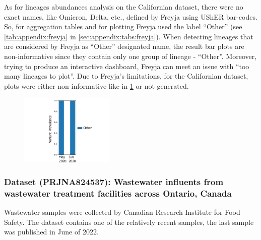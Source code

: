     As for lineages abundances analysis on the Californian dataset, there were no exact names, like Omicron, Delta, etc., defined by Freyja using UShER bar-codes. So, for aggregation tables and for plotting Freyja used the label “Other” (see \cref{tab:appendix:freyja} in \cref{sec:appendix:tabs:freyja}). When detecting lineages that are considered by Freyja as “Other” designated name, the result bar plots are non-informative since they contain only one group of lineage - “Other”. Moreover, trying to produce an interactive dashboard, Freyja can meet an issue with “too many lineages to plot”. Due to Freyja's limitations, for the Californian dataset, plots were either non-informative like in \cref{fig:results:real:non-informative-freyja} or not generated.
    \begin{figure}[ht!]
        \centering
        \includegraphics[width=0.4\textwidth]{figures/results/real/non-informative-freyja.png}
        \label{fig:results:real:non-informative-freyja}
    \end{figure}
    
    \subsubsection{Dataset (PRJNA824537): Wastewater influents from wastewater treatment facilities across Ontario, Canada} \label{sec:results:real:canada}
    Wastewater samples were collected by Canadian Research Institute for Food Safety. The dataset contains one of the relatively recent samples, the last sample was published in June of 2022.

